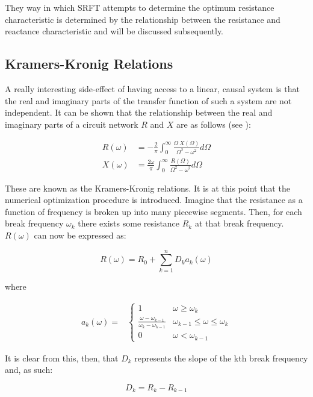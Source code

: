 They way in which SRFT attempts to determine the optimum resistance
characteristic is determined by the relationship between the resistance and
reactance characteristic and will be discussed subsequently.

\subsection*{Kramers-Kronig Relations}

A really interesting side-effect of having access to a linear, causal system is
that the real and imaginary parts of the transfer function of such a system are
not independent. It can be shown that the relationship between the real and
imaginary parts of a circuit network $R$ and $X$ are as follows (see \cite{wcd}):


\begin{align*}
    R(\omega) &= - \frac{2}{\pi} \int_{0}^{\infty} \frac{\Omega~X(\Omega)}{\Omega^2 -
\omega^2} d\Omega \\
    X(\omega) &= \frac{2\omega}{\pi} \int_{0}^{\infty}
\frac{R(\Omega)}{\Omega^2-\omega^2} d \Omega
\end{align*}

These are known as the Kramers-Kronig relations. It is at this point that the
numerical optimization procedure is introduced.  Imagine that the resistance as
a function of frequency is broken up into many piecewise segments. Then, for
each break frequency $\omega_k$ there exists some resistance $R_k$ at that break
frequency. $R(\omega)$ can now be expressed as:

\[ 
R(\omega) = R_0 + \sum^{n}_{k=1} D_k a_k(\omega) 
\]

where 

\begin{align*}
    a_k(\omega) =&
    \begin{cases}
        1 & \omega \ge \omega_k \\
        \frac{\omega - \omega_{k-1}}{\omega_k - \omega_{k-1}} &\omega_{k-1} \le
        \omega \le \omega_k \\
        0 &\omega < \omega_{k-1}
    \end{cases}
\end{align*}

It is clear from this, then, that $D_k$ represents the slope of the kth break
frequency and, as such:

\[ 
D_k = R_k - R_{k-1} 
\]

